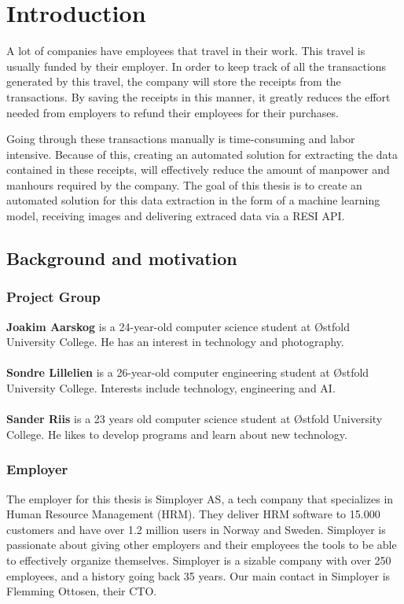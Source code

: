 \chapter{Introduction}
\label{ch:intro}
A lot of companies have employees that travel in their work.
This travel is usually funded by their employer.
In order to keep track of all the transactions generated by this travel, the company will store the receipts from the
transactions.
By saving the receipts in this manner, it greatly reduces the effort needed from employers to refund their employees
for their purchases.

Going through these transactions manually is time-consuming and labor intensive.
Because of this, creating an automated solution for extracting the data contained in these receipts, will effectively
reduce the amount of manpower and manhours required by the company.
The goal of this thesis is to create an automated solution for this data extraction in the form of a machine learning model, receiving images and delivering extraced data via a RESI API.
\section{Background and motivation}\label{sec:background-and-motivation}
\subsection{Project Group}\label{subsec:project-group}
\textbf{Joakim Aarskog} is a 24-year-old computer science student at Østfold University College.
He has an interest in technology and photography.\\
\\
\textbf{Sondre Lillelien} is a 26-year-old computer engineering student at Østfold University College.
Interests include technology, engineering and AI.\\
\\
\textbf{Sander Riis} is a 23 years old computer science student at Østfold University College.
He likes to develop programs and learn about new technology.

\subsection{Employer}\label{subsec:employer}
The employer for this thesis is Simployer AS, a tech company that specializes in Human Resource Management (HRM).
They deliver HRM software to 15.000 customers and have over 1.2 million users in Norway and Sweden.
Simployer is passionate about giving other employers and their employees the tools to be able to effectively organize themselves.
Simployer is a sizable company with over 250 employees, and a history going back 35 years.
Our main contact in Simployer is Flemming Ottosen, their CTO.

